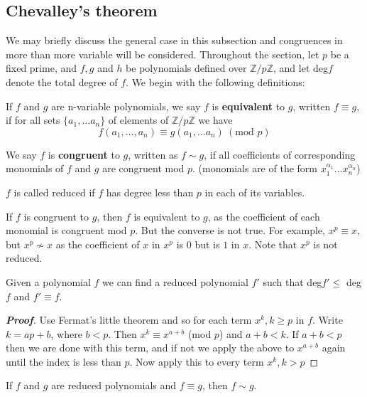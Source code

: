 \subsection{Chevalley's theorem}
We may briefly discuss the general case in this subsection and congruences in more than more variable will be considered. Throughout the section, let $p$ be a fixed prime, and $f,g$ and $h$ be polynomials defined over $\mathbb{Z}/p\mathbb{Z}$, and let deg$f$ denote the total degree of $f$. We begin with the following definitions:
\begin{definition} If $f$ and $g$ are n-variable polynomials, we say $f$ is {\bf equivalent} to $g$, written $f \equiv g$, if for all sets $\{a_1, \ldots a_n\}$ of elements of $\mathbb{Z}/p\mathbb{Z}$ we have
\begin{equation*} f(a_1, \ldots ,a_n) \equiv g(a_1, \ldots a_n)~(\text{mod }p) \end{equation*}
\end{definition}
\begin{definition} We say $f$ is {\bf congruent} to $g$, written as $f \sim g$, if all coefficients of corresponding monomials of $f$ and $g$ are congruent mod $p$. (monomials are of the form $x_1^{\alpha_1} \ldots x_n^{\alpha_n}$)
\end{definition}
\begin{definition} $f$ is called reduced if $f$ has degree less than $p$ in each of its variables.
\end{definition}
\begin{remark} If $f$ is congruent to $g$, then $f$ is equivalent to $g$, as the coefficient of each monomial is congruent mod $p$. But the converse is not true. For example, $x^p \equiv x$, but $x^p \not \sim x$ as the coefficient of $x$ in $x^p$ is $0$ but is $1$ in $x$. Note that $x^p$ is not reduced.
\end{remark}
\begin{lemma} Given a polynomial $f$ we can find a reduced polynomial $f'$ such that deg$f' \le$ deg$f$ and $f' \equiv f$.
\end{lemma}
\begin{proof}[\bf Proof] Use Fermat's little theorem and so for each term $x^k, k \ge p$ in $f$. Write $k=ap+b$, where $b<p$. Then $x^k \equiv x^{a+b}$ (mod $p$) and $a + b <k$. If $a+b<p$ then we are done with this term, and if not we apply the above to $x^{a+b}$ again until the index is less than $p$. Now apply this to every term $x^k, k>p$
\end{proof}
\begin{lemma} If $f$ and $g$ are reduced polynomials and $f \equiv g$, then $f \sim g$.
\end{lemma}
